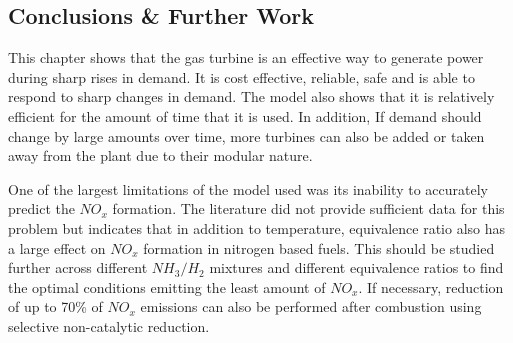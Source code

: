 \documentclass[11pt, oneside]{article}
\begin{document}
\subsection{Conclusions \& Further Work}
This chapter shows that the gas turbine is an effective way to generate power during sharp rises in demand. It is cost effective, reliable, safe and is able to respond to sharp changes in demand. The model also shows that it is relatively efficient for the amount of time that it is used. In addition, If demand should change by large amounts over time, more turbines can also be added or taken away from the plant due to their modular nature.

One of the largest limitations of the model used was its inability to accurately predict the $NO_x$ formation. The literature did not provide sufficient data for this problem but indicates that in addition to temperature, equivalence ratio also has a large effect on $NO_x$ formation in nitrogen based fuels. This should be studied further across different $NH_3/H_2$ mixtures and different equivalence ratios to find the optimal conditions emitting the least amount of $NO_x$. If necessary, reduction of up to 70\% of $NO_x$ emissions can also be performed after combustion using selective non-catalytic reduction. \cite{NOxeffect}%


\end{document}
